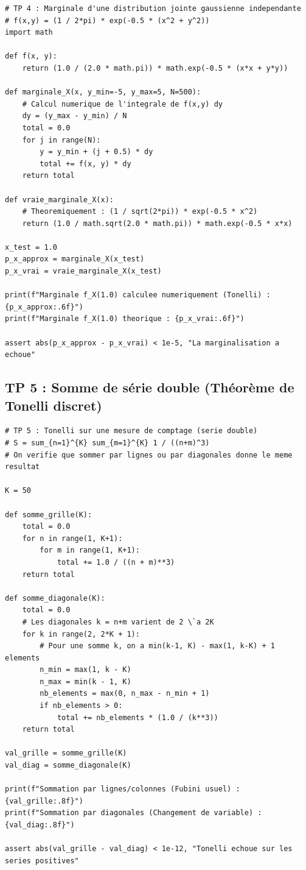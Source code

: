 \documentclass[11pt,a4paper]{article}
\begin{document}
\begin{lstlisting}
# TP 4 : Marginale d'une distribution jointe gaussienne independante
# f(x,y) = (1 / 2*pi) * exp(-0.5 * (x^2 + y^2))
import math

def f(x, y):
    return (1.0 / (2.0 * math.pi)) * math.exp(-0.5 * (x*x + y*y))

def marginale_X(x, y_min=-5, y_max=5, N=500):
    # Calcul numerique de l'integrale de f(x,y) dy
    dy = (y_max - y_min) / N
    total = 0.0
    for j in range(N):
        y = y_min + (j + 0.5) * dy
        total += f(x, y) * dy
    return total

def vraie_marginale_X(x):
    # Theoremiquement : (1 / sqrt(2*pi)) * exp(-0.5 * x^2)
    return (1.0 / math.sqrt(2.0 * math.pi)) * math.exp(-0.5 * x*x)

x_test = 1.0
p_x_approx = marginale_X(x_test)
p_x_vrai = vraie_marginale_X(x_test)

print(f"Marginale f_X(1.0) calculee numeriquement (Tonelli) : {p_x_approx:.6f}")
print(f"Marginale f_X(1.0) theorique : {p_x_vrai:.6f}")

assert abs(p_x_approx - p_x_vrai) < 1e-5, "La marginalisation a echoue"
\end{lstlisting}


\subsection*{TP 5 : Somme de série double (Théorème de Tonelli discret)}

\begin{lstlisting}
# TP 5 : Tonelli sur une mesure de comptage (serie double)
# S = sum_{n=1}^{K} sum_{m=1}^{K} 1 / ((n+m)^3)
# On verifie que sommer par lignes ou par diagonales donne le meme resultat

K = 50

def somme_grille(K):
    total = 0.0
    for n in range(1, K+1):
        for m in range(1, K+1):
            total += 1.0 / ((n + m)**3)
    return total

def somme_diagonale(K):
    total = 0.0
    # Les diagonales k = n+m varient de 2 \`a 2K
    for k in range(2, 2*K + 1):
        # Pour une somme k, on a min(k-1, K) - max(1, k-K) + 1 elements
        n_min = max(1, k - K)
        n_max = min(k - 1, K)
        nb_elements = max(0, n_max - n_min + 1)
        if nb_elements > 0:
            total += nb_elements * (1.0 / (k**3))
    return total

val_grille = somme_grille(K)
val_diag = somme_diagonale(K)

print(f"Sommation par lignes/colonnes (Fubini usuel) : {val_grille:.8f}")
print(f"Sommation par diagonales (Changement de variable) : {val_diag:.8f}")

assert abs(val_grille - val_diag) < 1e-12, "Tonelli echoue sur les series positives"
\end{lstlisting}
\end{document}

